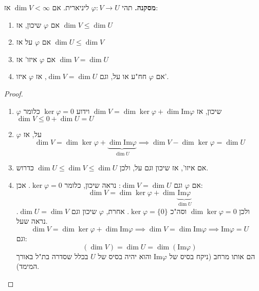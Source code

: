\documentclass[]{article}
\newcommand\Img   {\mathrm{Im}}
\renewcommand\inf {\infty}
\newcommand\co        {\colon}
\renewcommand\phi     {\varphi}
\begin{document}
	\textbf{מסקנה. }תהי $\phi \co V \to U$ ליניארית. אם $\dim V < \inf$ אז: 
	\begin{enumerate}
		\item אם $\phi$ שיכון, אז $\dim V \le \dim U$
		\item אם $\phi$ על אז $\dim U \le \dim V$
		\item אם $\phi$ איזו' אז $\dim V = \dim U$
		\item אם $\phi$ חח"ע או על, וגם $\dim V = \dim U$, אז $\phi$ איזו'. 
	\end{enumerate}
	
	\begin{proof}
		\begin{enumerate}
			\item $\phi$ שיכון, אז  $\dim V = \dim \ker \phi + \dim \Img \phi$ וידוע $\ker\phi = 0$ כלומר $\dim V \le 0 + \dim U = U$ 
			\item $\phi$ על, אז 
			\[ \dim V = \dim \ker \phi + \underbrace{\dim \Img \phi}_{\dim U} \implies \dim V -\dim \ker\phi = \dim U \]
			\item אם איזו', אז שיכון וגם על, ולכן $\dim U \le \dim V \le \dim U$ כדרוש. 
			\item אם $\phi$ וגם $\dim V = \dim U$: נראה שיכון, כלומר $\ker\phi = 0$. אכן: 
			\[ \dim V = \dim \ker\phi + \dim \underbrace{\Img\phi}_{\dim U} \]
			ולכן $\dim \ker \phi = 0$ וסה"כ $\ker\phi = \{0\}$. 
			אחרת, $\phi$ שיכון וגם $\dim U = \dim V$. נראה שעל. 
			\[ \dim V = \dim \ker\phi + \dim \Img\phi \implies \dim V = \dim \Img\phi \implies \Img\phi = U \]
			וגם: 
			\[ (\dim V)= \dim U = \dim (\Img\phi) \]
			הם אותו מרחב (ניקח בסיס של $\Img \phi$ והוא יהיה בסיס של $U$ בכלל שסדרה בת"ל באורך המימד). 
		\end{enumerate}
	\end{proof}
	
\end{document}
